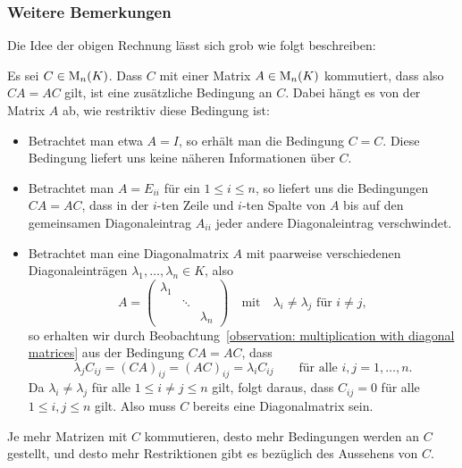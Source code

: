 \subsubsection{Weitere Bemerkungen}

\begin{remark}
  Die Idee der obigen Rechnung lässt sich grob wie folgt beschreiben:
  
  Es sei $C \in \operatorname{M}_{n}(K)$.
  Dass $C$ mit einer Matrix $A \in \operatorname{M}_{n}(K)$ kommutiert, dass also $CA = AC$ gilt, ist eine zusätzliche Bedingung an $C$.
  Dabei hängt es von der Matrix $A$ ab, wie restriktiv diese Bedingung ist:
  \begin{itemize}
    \item
      Betrachtet man etwa $A = I$, so erhält man die Bedingung $C = C$.
      Diese Bedingung liefert uns keine näheren Informationen über $C$.
    \item
      Betrachtet man $A = E_{ii}$ für ein $1 \leq i \leq n$, so liefert uns die Bedingungen $CA = AC$, dass in der $i$-ten Zeile und $i$-ten Spalte von $A$ bis auf den gemeinsamen Diagonaleintrag $A_{ii}$ jeder andere Diagonaleintrag verschwindet.
    \item
      Betrachtet man eine Diagonalmatrix $A$ mit paarweise verschiedenen Diagonaleinträgen $\lambda_1, \dotsc, \lambda_n \in K$, also
      \[
          A
        = \begin{pmatrix}
            \lambda_1 &         &           \\
                      & \ddots  &           \\
                      &         & \lambda_n
          \end{pmatrix}
          \quad\text{mit}\quad
          \text{$\lambda_i \neq \lambda_j$ für $i \neq j$},
      \]
      so erhalten wir durch Beobachtung~\ref{observation: multiplication with diagonal matrices} aus der Bedingung $CA = AC$, dass
      \[
          \lambda_j C_{ij}
        = (CA)_{ij}
        = (AC)_{ij}
        = \lambda_i C_{ij}
        \qquad
        \text{für alle $i, j = 1, \dotsc, n$}.
      \]
      Da $\lambda_i \neq \lambda_j$ für alle $1 \leq i \neq j \leq n$ gilt, folgt daraus, dass $C_{ij} = 0$ für alle $1 \leq i,j \leq n$ gilt.
      Also muss $C$ bereits eine Diagonalmatrix sein.
  \end{itemize}
  Je mehr Matrizen mit $C$ kommutieren, desto mehr Bedingungen werden an $C$ gestellt, und desto mehr Restriktionen gibt es bezüglich des Aussehens von $C$.
  

\end{remark}
